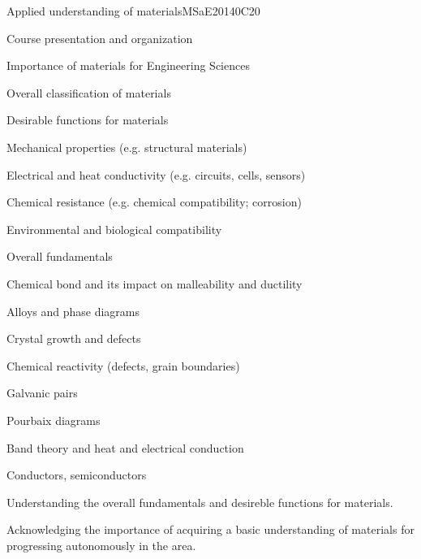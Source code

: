 \begin{syllabus}
\begin{unit}{Applied understanding of materials}{}{MSaE2014}{0}{C20}
\begin{topics}
      \item Course presentation and organization
      \item Importance of materials for Engineering Sciences
      \item Overall classification of materials
      \item Desirable functions for materials
	  \begin{subtopics}
	  \item Mechanical properties (e.g. structural materials)
	  \item Electrical and heat conductivity (e.g. circuits, cells, sensors)
	  \item Chemical resistance (e.g. chemical compatibility; corrosion)
	  \item Environmental and biological compatibility
	  \end{subtopics}
      \item Overall fundamentals
	  \begin{subtopics}
	  \item Chemical bond and its impact on malleability and ductility
	  \item Alloys and phase diagrams
	  \item Crystal growth and defects
	  \item Chemical reactivity (defects, grain boundaries)
	  \item Galvanic pairs
	  \item Pourbaix diagrams
	  \item Band theory and heat and electrical conduction
	  \item Conductors, semiconductors
	  \end{subtopics}      
\end{topics}
   \begin{learningoutcomes}
    \item Understanding the overall fundamentals and desireble functions for materials.
    \item Acknowledging the importance of acquiring a basic understanding of materials for progressing autonomously in the area.
   \end{learningoutcomes}
\end{unit}



\end{syllabus}
